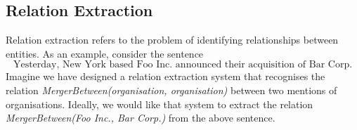 \subsection{Relation Extraction}
\label{relation_extract}
Relation extraction refers to the problem of identifying relationships between entities. As an example, consider the sentence 
$$
\text{Yesterday, New York based Foo Inc. announced their acquisition of Bar Corp.}
$$ 
Imagine we have designed a relation extraction system that recognises the relation \textit{MergerBetween(organisation, organisation)} between two mentions of organisations. Ideally, we would like that system to extract the relation \textit{MergerBetween(Foo Inc., Bar Corp.)} from the above sentence.